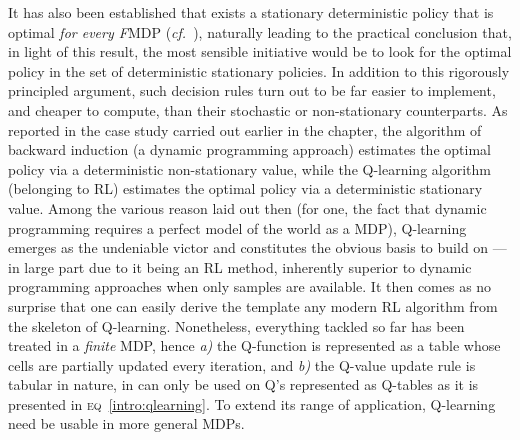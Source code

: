 It has also been established that exists a stationary deterministic policy that is optimal
\emph{for every F}MDP (\textit{cf.}~\cite{Ross1983-oc,Puterman1994-pf}), naturally leading to
the practical conclusion that, in light of this result,
the most sensible initiative would be to look for the optimal policy in the set of deterministic stationary policies.
In addition to this rigorously principled argument, such decision rules turn out to be
far easier to implement, and cheaper to compute, than their stochastic or non-stationary counterparts.
As reported in the case study carried out earlier in the chapter,
the algorithm of backward induction (a dynamic programming approach)
estimates the optimal policy via a deterministic non-stationary value,
while the Q-learning algorithm (belonging to RL)
estimates the optimal policy via a deterministic stationary value.
Among the various reason laid out then
(for one, the fact that dynamic programming requires a perfect model of the world as a MDP),
Q-learning emerges as the undeniable victor and constitutes the obvious basis to build on
--- in large part due to it being an RL method, inherently superior to
dynamic programming approaches when only samples are available.
It then comes as no surprise that one can easily derive the template
any modern RL algorithm
from the skeleton of Q-learning.
Nonetheless, everything tackled so far has been treated in a \emph{finite} MDP, hence
\textit{a)} the Q-function is represented as a table whose cells are partially updated every iteration, and
\textit{b)} the Q-value update rule is tabular in nature, in can only be used on Q's represented as Q-tables
as it is presented in \textsc{eq}~\ref{intro:qlearning}.
To extend its range of application, Q-learning need be usable in more general MDPs.

